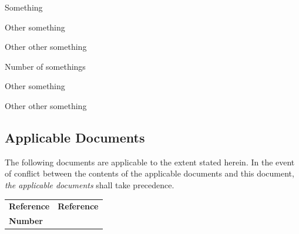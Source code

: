 \documentclass[11pt,a4paper]{article}
\begin{document}
\aeneasfrontpage

\aeneastableofcontents

\aeneaslistofabbreviations
\begin{basedescript}{\desclabelstyle{\pushlabel}\desclabelwidth{6em}}
    \item[SOMETHING] Something \vspace{-0.2cm}
    \item[OTHER] Other something \vspace{-0.2cm}
    \item[OTHER] Other other something \vspace{-0.2cm}
\end{basedescript} 

\aeneaslistofsymbols
\begin{basedescript}{\desclabelstyle{\pushlabel}\desclabelwidth{6em}}
    \item[$N_\mathrm{something}$] Number of somethings \vspace{-0.2cm}
    \item[OTHER] Other something \vspace{-0.2cm}
    \item[OTHER] Other other something \vspace{-0.2cm}
\end{basedescript} 


\aeneaslistoffigures

\aeneaslistoftables

\aeneassummary

\aeneasreferencedocs

\subsection*{Applicable Documents}

The following documents are applicable to the extent stated herein. In the
event of conflict between the contents of the applicable documents and this
document, \emph{the applicable documents} shall take precedence.

\begin{center}{
\begin{tabularx}{\textwidth}{|X|X|}
    \hline
    \bf{Reference} & \bf{Reference}\\
    \bf{Number} & \\
    \hline
\end{tabularx}}
\end{center}
\end{document}
